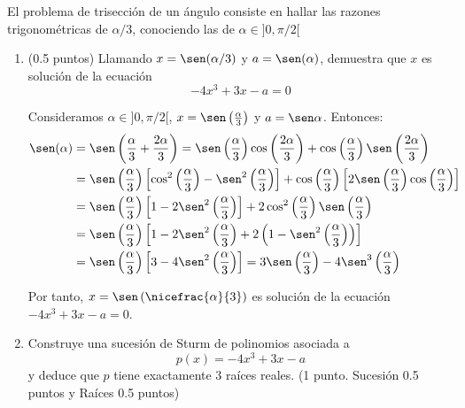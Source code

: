 \documentclass[12pt]{article}
\begin{document}
    \begin{ejercicio}[4 puntos]
        El problema de trisección de un ángulo consiste en hallar las razones trigonométricas de $\alpha/3$, conociendo las de $\alpha \in ]0, \pi/2[$
        \begin{enumerate}
          \item (0.5 puntos) Llamando \( x = \sen(\alpha/3) \) y \( a = \sen(\alpha) \), demuestra que $x$ es solución de la ecuación
          \begin{equation*}
            -4x^3 + 3x - a = 0
          \end{equation*}

          Consideramos $\alpha \in ]0, \pi/2[$, $x = \sen\left(\frac{\alpha}{3}\right)$ y $a = \sen \alpha$. Entonces:
          \begin{align*}
              \sen(\alpha)
              &= \sen\left(\dfrac{\alpha}{3}+\dfrac{2\alpha}{3}\right)=\sen\left(\dfrac{\alpha}{3}\right)\cos\left(\dfrac{2\alpha}{3}\right)+\cos\left(\dfrac{\alpha}{3}\right)\sen\left(\dfrac{2\alpha}{3}\right)\\
              &= \sen\left(\dfrac{\alpha}{3}\right)\left[\cos^2\left(\dfrac{\alpha}{3}\right)-\sen^2\left(\dfrac{\alpha}{3}\right)\right]+\cos\left(\dfrac{\alpha}{3}\right)\left[2\sen\left(\dfrac{\alpha}{3}\right)\cos\left(\dfrac{\alpha}{3}\right)\right]\\
              &= \sen\left(\dfrac{\alpha}{3}\right)\left[1-2\sen^2\left(\dfrac{\alpha}{3}\right)\right]+2\cos^2\left(\dfrac{\alpha}{3}\right)\sen\left(\dfrac{\alpha}{3}\right)\\
              &= \sen\left(\dfrac{\alpha}{3}\right)\left[1-2\sen^2\left(\dfrac{\alpha}{3}\right)+2\left(1-\sen^2\left(\dfrac{\alpha}{3}\right)\right)\right]\\
              &= \sen\left(\dfrac{\alpha}{3}\right)\left[3-4\sen^2\left(\dfrac{\alpha}{3}\right)\right]
              = 3\sen\left(\dfrac{\alpha}{3}\right)-4\sen^3\left(\dfrac{\alpha}{3}\right)
          \end{align*}

          Por tanto, $x=\sen\left(\nicefrac{\alpha}{3}\right)$ es solución de la ecuación $-4x^3 + 3x - a = 0$.

          \item Construye una sucesión de Sturm de polinomios asociada a $$ p(x) = -4x^3 + 3x - a $$ y deduce que \( p \) tiene exactamente 3 raíces reales. (1 punto. Sucesión 0.5 puntos y Raíces 0.5 puntos) \\
          

\end{enumerate}
\end{ejercicio}
\end{document}
